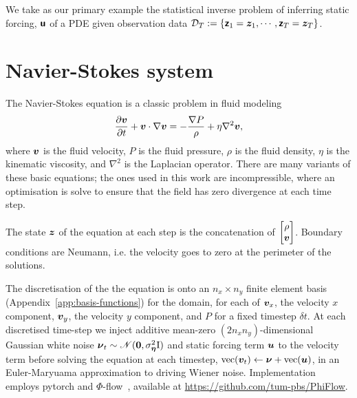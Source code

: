 
We take as our primary example the statistical  inverse problem of inferring  static forcing, $\boldsymbol{\mathsf{u}}$ of a PDE given observation data \(\mathcal{D}_T:=\{\boldsymbol{\mathsf{z}}_{1}=\boldsymbol{z}_{1},\cdots, \boldsymbol{\mathsf{z}}_{T}=\boldsymbol{z}_{T}\}\).


\section{Navier-Stokes system}\label{app:pdes}

The Navier-Stokes equation is a classic problem in fluid modeling
\[
\frac{\partial \boldsymbol{v}}{\partial t}+\boldsymbol{v} \cdot \nabla \boldsymbol{v}=-\frac{\nabla P}{\rho}+\eta \nabla^2 \boldsymbol{v},
\]
where \(\boldsymbol{v}\) is the fluid velocity, \(P\) is the fluid pressure, \(\rho\) is the fluid density, \(\eta\) is the kinematic viscosity, and \(\nabla^2\) is the Laplacian operator.
There are many variants of these basic equations; the ones used in this work are incompressible, where an optimisation is solve to ensure that the field has zero divergence at each time step.

The state \(\boldsymbol{z}\) of the equation at each step is the concatenation of \(\begin{bmatrix}\rho\\ \boldsymbol{v}\end{bmatrix}\).
Boundary conditions are Neumann, i.e. the velocity goes to zero at the perimeter of the solutions.

The discretisation of the the equation is onto an \(n_x\times n_y\) finite element basis (Appendix~\ref{app:basis-functions}) for the domain, for each of \(\boldsymbol{v}_x\), the velocity \(x\) component, \(\boldsymbol{v}_y\), the velocity \(y\) component, and \(P\) for a fixed timestep \(\delta t\).
At each discretised time-step we inject additive mean-zero \((2n_xn_y)\)-dimensional Gaussian white noise \(\boldsymbol{\mathsf{\nu}}_{t}\sim\mathscr{N}(\boldsymbol{0},\sigma^2_{\boldsymbol{\mathsf{\eta}}}\mathrm{I})\) and static forcing term \(\boldsymbol{u}\) to the velocity term before solving the equation at each timestep,
\(\operatorname{vec}(\boldsymbol{v}_t)\gets \boldsymbol{\mathsf{\nu}} + \operatorname{vec}(\boldsymbol{u})\), in an Euler-Maryuama approximation to driving Wiener noise.
Implementation employs pytorch and \(\Phi\)-flow~\citep{HollPhiflow2020}, available at \url{https://github.com/tum-pbs/PhiFlow}.



